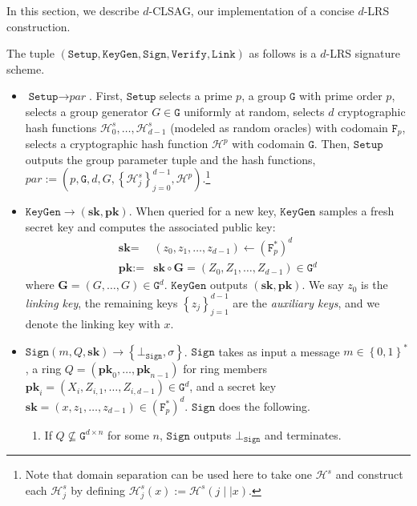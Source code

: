 \documentclass{llncs}
\newcommand{\F}{\texttt{F}_p}
\newcommand{\G}{\texttt{G}}
\newcommand{\Hp}{\mathcal{H}^p}
\newcommand{\Hs}{\mathcal{H}^s}
\begin{document}
In this section, we describe $d$-CLSAG, our implementation of a concise $d$-LRS construction.

\begin{definition}[$d$-CLSAG]\label{def:clsag}
The tuple $(\texttt{Setup}, \texttt{KeyGen}, \texttt{Sign}, \texttt{Verify}, \allowbreak \texttt{Link})$ as follows is a $d$-LRS signature scheme.

\begin{itemize}
\item $\texttt{Setup} \to \textit{par}$. First, $\texttt{Setup}$ selects a prime $p$, a group $\G$ with prime order $p$, selects a group generator $G \in \G$ uniformly at random, selects $d$ cryptographic hash functions $\Hs_0, \ldots, \Hs_{d-1}$ (modeled as random oracles) with codomain $\F$, selects a cryptographic hash function $\Hp$ with codomain $\G$. Then, $\texttt{Setup}$ outputs the group parameter tuple and the hash functions, $\textit{par} := \left(p,\G, d, G, \left\{\Hs_j\right\}_{j=0}^{d-1}, \Hp\right)$.\footnote{Note that domain separation can be used here to take one $\Hs$ and construct each $\Hs_j$ by defining $\Hs_j(x) := \Hs(j \mid\mid x)$.}

\item $\texttt{KeyGen} \to (\textbf{sk}, \textbf{pk})$. When queried for a new key, $\texttt{KeyGen}$ samples a fresh secret key and computes the associated public key:
\begin{align*}
\textbf{sk} =& (z_0, z_1, \ldots, z_{d-1}) \leftarrow (\F^*)^d\\
\textbf{pk} :=& \textbf{sk} \circ \textbf{G} = (Z_0, Z_1, \ldots, Z_{d-1}) \in \G^d
\end{align*} where $\textbf{G} = (G, \ldots, G) \in \G^d$. $\texttt{KeyGen}$ outputs $(\textbf{sk}, \textbf{pk})$. We say $z_0$ is the \textit{linking key}, the remaining keys $\left\{z_j\right\}_{j=1}^{d-1}$ are the \textit{auxiliary keys}, and we denote the linking key with $x$.

\item $\texttt{Sign}\left(m, Q, \textbf{sk}\right) \to \left\{\bot_{\texttt{Sign}}, \sigma\right\}$. $\texttt{Sign}$ takes as input a message $m \in \left\{0,1\right\}^*$, a ring  $Q = (\textbf{pk}_0, \ldots, \textbf{pk}_{n-1})$ for ring members $\textbf{pk}_i = (X_i, Z_{i,1}, \ldots, Z_{i,d-1}) \in \G^d$, and a secret key $\textbf{sk} = (x,z_1, \ldots, z_{d-1}) \in (\F^*)^d$. $\texttt{Sign}$ does the following.

\begin{enumerate}
\item If $Q \not\subseteq \G^{d\times n}$ for some $n$, $\texttt{Sign}$ outputs $\bot_{\texttt{Sign}}$ and terminates.


\end{enumerate}
\end{itemize}
\end{definition}
\end{document}
